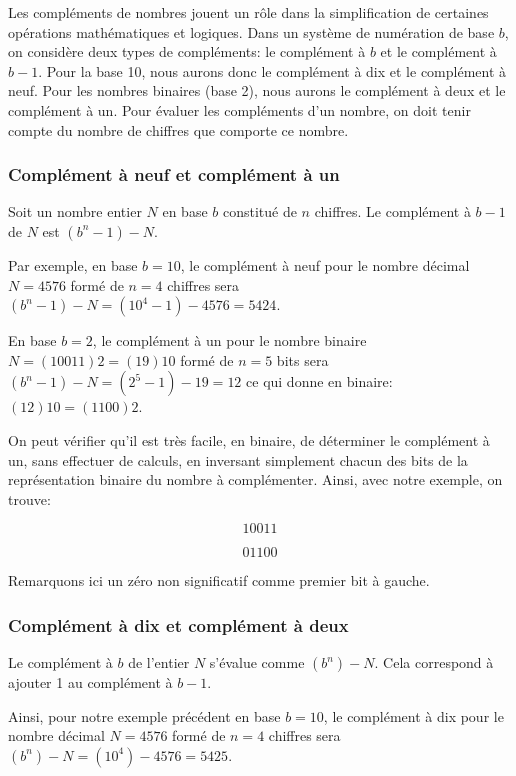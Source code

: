 \documentclass[11pt]{article}
\begin{document}
Les compléments de nombres jouent un rôle dans la simplification de
certaines opérations mathématiques et logiques. Dans un système de
numération de base \(b\), on considère deux types de compléments: le
complément à \(b\) et le complément à \(b-1\). Pour la base 10, nous
aurons donc le complément à dix et le complément à neuf. Pour les
nombres binaires (base 2), nous aurons le complément à deux et le
complément à un.  Pour évaluer les compléments d'un nombre, on doit
tenir compte du nombre de chiffres que comporte ce nombre.

\subsubsection{Complément à neuf et complément à un}
\label{sec:orgc6dcd1e}

Soit un nombre entier \(N\) en base \(b\) constitué de \(n\) chiffres. Le
complément à \(b-1\) de \(N\) est \((b^n-1)-N\).

Par exemple, en base \(b=10\), le complément à neuf pour le nombre décimal
\(N = 4576\) formé de \(n=4\) chiffres sera \((b^n-1)-N = (10^4 -1) -
4576 = 5424\).

En base \(b=2\), le complément à un pour le nombre binaire \(N =
(10011)2 = (19)10\) formé de \(n=5\) bits sera \((b^n-1)-N = (2^5
-1) - 19 = 12\) ce qui donne en binaire: \((12)10 = (1100)2\).

On peut vérifier qu'il est très facile, en binaire, de déterminer le
complément à un, sans effectuer de calculs, en inversant simplement
chacun des bits de la représentation binaire du nombre à
complémenter. Ainsi, avec notre exemple, on trouve:

$$ 10011 $$

$$ 01100 $$

Remarquons ici un zéro non significatif comme premier bit à gauche.

\subsubsection{Complément à dix et complément à deux}
\label{sec:org3d9fc54}

Le complément à \(b\) de l'entier \(N\) s'évalue comme
\((b^n)-N\). Cela correspond à ajouter 1 au complément à \(b-1\).

Ainsi, pour notre exemple précédent en base \(b=10\), le complément à
dix pour le nombre décimal \(N = 4576\) formé de \(n=4\) chiffres sera
\((b^n)-N = (10^4) - 4576 = 5425\).
\end{document}
